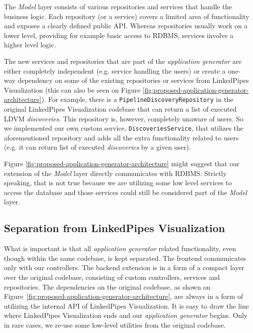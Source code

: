 The \emph{Model} layer consists of various repositories and services that handle the business logic. Each repository (or a service) covers a limited area of functionality and exposes a clearly defined public API. Whereas repositories usually work on a lower level, providing for example basic access to RDBMS, services involve a higher level logic.

The new services and repositories that are part of the \emph{application generator} are either completely independent (e.g. service handling the users) or create a one-way dependency on some of the existing repositories or services from LinkedPipes Visualization (this can also be seen on Figure \ref{fig:proposed-application-generator-architecture}). For example, there is a \texttt{PipelineDiscoveryRepository} in the original LinkedPipes Visualization codebase that can return a list of executed LDVM \emph{discoveries}. This repository is, however, completely unaware of users. So we implemented our own custom service, \texttt{DiscoveriesService}, that utilizes the aforementioned repository and adds all the extra functionality related to users (e.g. it can return list of executed \emph{discoveries} by a given user).

Figure \ref{fig:proposed-application-generator-architecture} might suggest that our extension of the \emph{Model} layer directly communicates with RDBMS. Strictly speaking, that is not true because we are utilizing some low level services to access the database and those services could still be considered part of the \emph{Model} layer.

\subsection{Separation from LinkedPipes Visualization}

What is important is that all \emph{application generator} related functionality, even though within the same codebase, is kept separated. The frontend communicates only with our controllers. The backend extension is in a form of a compact layer over the original codebase, consisting of custom controllers, services and repositories. The dependencies on the original codebase, as shown on Figure~\ref{fig:proposed-application-generator-architecture}, are always in a form of utilizing the internal API of LinkedPipes Visualization. It is easy to draw the line where LinkedPipes Visualization ends and our \emph{application generator} begins. Only in rare cases, we re-use some low-level utilities from the original codebase.

